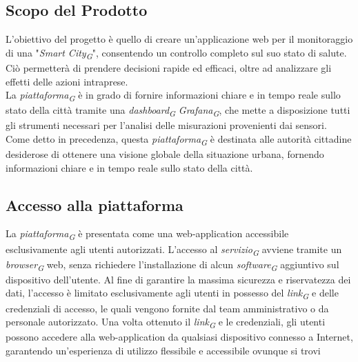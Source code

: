 \subsection{Scopo del Prodotto}
L'obiettivo del progetto è quello di creare un'applicazione web per il monitoraggio di una "\textit{Smart City}\textsubscript{\textit{G}}", consentendo un controllo completo sul suo stato di salute. Ciò permetterà di prendere decisioni rapide ed efficaci, oltre ad analizzare gli effetti delle azioni intraprese.\\
La \textit{piattaforma}\textsubscript{\textit{G}} è in grado di fornire informazioni chiare e in tempo reale sullo stato della città tramite una \textit{dashboard}\textsubscript{\textit{G}} \textit{Grafana}\textsubscript{\textit{G}}, che mette a disposizione tutti gli strumenti necessari per l'analisi delle misurazioni provenienti dai sensori.\\
Come detto in precedenza, questa \textit{piattaforma}\textsubscript{\textit{G}} è destinata alle autorità cittadine desiderose di ottenere una visione globale della situazione urbana, fornendo informazioni chiare e in tempo reale sullo stato della città.

\subsection{Accesso alla piattaforma}
La \textit{piattaforma}\textsubscript{\textit{G}} è presentata come una web-application accessibile esclusivamente agli utenti autorizzati. L'accesso al \textit{servizio}\textsubscript{\textit{G}} avviene tramite un \textit{browser}\textsubscript{\textit{G}} web, senza richiedere l'installazione di alcun \textit{software}\textsubscript{\textit{G}} aggiuntivo sul dispositivo dell'utente. Al fine di garantire la massima sicurezza e riservatezza dei dati, l'accesso è limitato esclusivamente agli utenti in possesso del \textit{link}\textsubscript{\textit{G}} e delle credenziali di accesso, le quali vengono fornite dal team amministrativo o da personale autorizzato. Una volta ottenuto il \textit{link}\textsubscript{\textit{G}} e le credenziali, gli utenti possono accedere alla web-application da qualsiasi dispositivo connesso a Internet, garantendo un'esperienza di utilizzo flessibile e accessibile ovunque si trovi